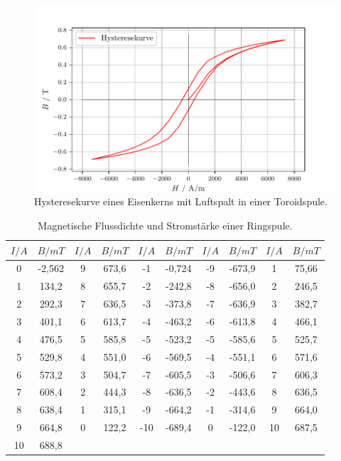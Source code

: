 \begin{figure}[H]
  \centering
  \includegraphics{plothyst.pdf}
  \caption{Hysteresekurve eines Eisenkerns mit Luftspalt in einer Toroidspule.}
  \label{fig:plot}
\end{figure}


\begin{table}[H]
  \centering
  \caption{Magnetische Flussdichte und Stromstärke einer Ringspule.}
  \begin{tabular}{c c | c c | c c | c c | c c}
    \toprule
     $I/A$ & $B/mT$ &$I/A$ & $B/mT$ & $I/A$ & $B/mT$ &$I/A$ & $B/mT$ & $I/A$ & $B/mT$  \\
    \midrule
    0 &-2,562 & 9 & 673,6 & -1 & -0,724 & -9 & -673,9 & 1 & 75,66\\
    1 & 134,2 & 8 & 655,7 & -2 & -242,8 & -8 & -656,0 & 2 & 246,5\\
    2 & 292,3 & 7 & 636,5 & -3 & -373,8 & -7 & -636,9 & 3 & 382,7\\
    3 & 401,1 & 6 & 613,7 & -4 & -463,2 & -6 & -613,8 & 4 & 466,1\\
    4 & 476,5 & 5 & 585,8 & -5 & -523,2 & -5 & -585,6 & 5 & 525,7\\
    5 & 529,8 & 4 & 551,0 & -6 & -569,5 & -4 & -551,1 & 6 & 571,6\\
    6 & 573,2 & 3 & 504,7 & -7 & -605,5 & -3 & -506,6 & 7 & 606,3\\
    7 & 608,4 & 2 & 444,3 & -8 & -636,5 & -2 & -443,6 & 8 & 636,5\\
    8 & 638,4 & 1 & 315,1 & -9 & -664,2 & -1 & -314,6 & 9 & 664,0\\
    9 & 664,8 & 0 & 122,2 & -10 & -689,4 & 0 & -122,0 & 10 & 687,5\\
    10 & 688,8 \\
   
    
  \bottomrule
  \end{tabular}
\end{table}

